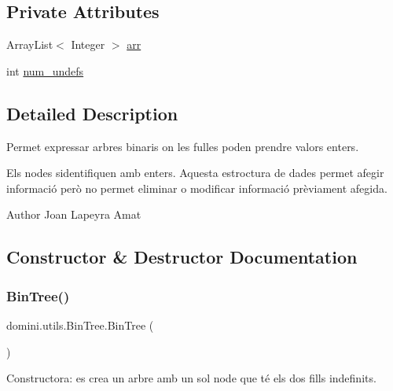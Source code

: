 \subsection*{Private Attributes}
\begin{DoxyCompactItemize}
\item 
Array\+List$<$ Integer $>$ \hyperlink{classdomini_1_1utils_1_1BinTree_a357bcbcf07ba7fcb99d11b237d189e65}{arr}
\item 
int \hyperlink{classdomini_1_1utils_1_1BinTree_a36f1212262c353accbc0a0385fa45a8d}{num\+\_\+undefs}
\end{DoxyCompactItemize}


\subsection{Detailed Description}
Permet expressar arbres binaris on les fulles poden prendre valors enters. 

Els nodes s\textquotesingle{}identifiquen amb enters. Aquesta estroctura de dades permet afegir informació però no permet eliminar o modificar informació prèviament afegida.

\begin{DoxyAuthor}{Author}
Joan Lapeyra Amat 
\end{DoxyAuthor}


\subsection{Constructor \& Destructor Documentation}
\mbox{\label{classdomini_1_1utils_1_1BinTree_a46082da82a1186c5a99ae68eee6ece13}} 
\subsubsection{\texorpdfstring{Bin\+Tree()}{BinTree()}\hspace{0.1cm}{\footnotesize\ttfamily [1/3]}}
{\footnotesize\ttfamily domini.\+utils.\+Bin\+Tree.\+Bin\+Tree (\begin{DoxyParamCaption}{ }\end{DoxyParamCaption})\hspace{0.3cm}{\ttfamily [inline]}}



Constructora\+: es crea un arbre amb un sol node que té els dos fills indefinits. 


